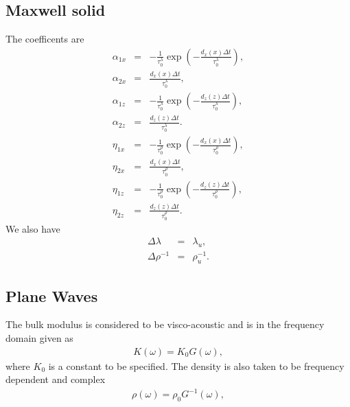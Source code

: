 \documentclass[11pt]{article}
\begin{document}
{\subsection*{Maxwell solid}
The coefficents are
\begin{eqnarray}
  \alpha_{1x} & = & -\frac{1}{\tau^{\lambda}_0}\exp\left(-\frac{d_x(x)\Delta t}
                          {\tau^{\lambda}_0}\right),              \\
  \alpha_{2x} & = & \frac{d_x(x)\Delta t}
                  {\tau^{\lambda}_0},                             \\
  \alpha_{1z} & = & -\frac{1}{\tau^{\lambda}_0}\exp\left(-\frac{d_z(z)\Delta t}
                  {\tau^{\lambda}_0}\right),                      \\
  \alpha_{2z}  & = & \frac{d_z(z)\Delta t}
                  {\tau^{\lambda}_0}.                             \\
  \eta_{1x} & = & -\frac{1}{\tau^{\rho}_0}\exp\left(-\frac{d_x(x)\Delta t}
                          {\tau^{\rho}_0}\right),                 \\
  \eta_{2x} & = & \frac{d_x(x)\Delta t}
                  {\tau^{\rho}_0},                                \\
  \eta_{1z} & = & -\frac{1}{\tau^{\rho}_0}\exp\left(-\frac{d_z(z)\Delta t}
                  {\tau^{\rho}_0}\right),                         \\
  \eta_{2z}  & = & \frac{d_z(z)\Delta t}
                  {\tau^{\rho}_0}.                                
\end{eqnarray}
We also have
\begin{eqnarray}
  \Delta \lambda 
    & = & \lambda_u,                  \\
  \Delta \rho^{-1} 
    & = & \rho^{-1}_u.
\end{eqnarray}
\subsection*{Plane Waves }
The bulk modulus is considered to be visco-acoustic and is in the
frequency domain given as
\begin{eqnarray}
 K(\omega) = K_0 G(\omega),
                                    \label{eq:12}
\end{eqnarray}
where $K_0$ is a constant to be specified.
The density is also taken to be frequency dependent and complex
\begin{eqnarray}
 \rho(\omega) = \rho_0 G^{-1}(\omega),
                                    \label{eq:13}
\end{eqnarray}

}
\end{document}
